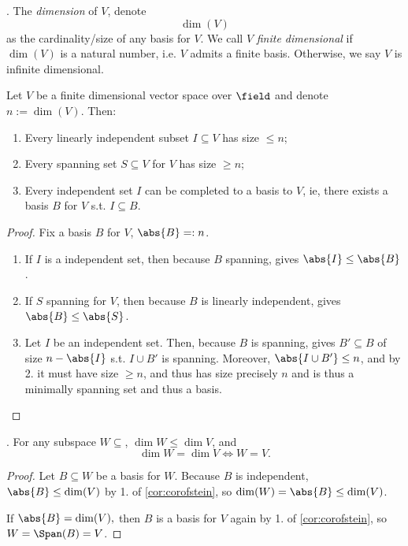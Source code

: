 \begin{definition}[Dimension]
     . The \emph{dimension} of $V$, denote $$\dim (V)$$ as the cardinality/size of any basis for $V$. We call $V$ \emph{finite dimensional} if $\dim (V)$ is a natural number, i.e. $V$ admits a finite basis. Otherwise, we say $V$ is infinite dimensional.
\end{definition}

\begin{corollary}\label{cor:corofstein}
    Let $V$ be a finite dimensional vector space over $\field$ and denote $n := \dim (V)$. Then: 
    \begin{enumerate}
        \item Every linearly independent subset $I \subseteq V$ has size $\leq n$;
        \item Every spanning set $S \subseteq V$ for $V$ has size $\geq n$;
        \item Every independent set $I$ can be completed to a basis to $V$, ie, there exists a basis $B$ for $V$ s.t. $I \subseteq B$.
    \end{enumerate}
\end{corollary}

\begin{proof}
    Fix a basis $B$ for $V$, $\abs{B} =: n$.
    \begin{enumerate}
        \item If $I$ is a independent set, then because $B$ spanning,  gives $\abs{I} \leq \abs{B}$.
        \item If $S$ spanning for $V$, then because $B$ is linearly independent,  gives $\abs{B} \leq \abs{S}$.
        \item Let $I$ be an independent set. Then, because $B$ is spanning,  gives $B' \subseteq B$ of size $n - \abs{I}$ s.t. $I \cup B'$ is spanning. Moreover, $\abs{I \cup B'} \leq n$, and by 2. it must have size $\geq n$, and thus has size precisely $n$ and is thus a minimally spanning set and thus a basis.
    \end{enumerate}
\end{proof}

\begin{corollary}
     . For any subspace $W \subseteq $, $\dim W \leq \dim V$, and $$\dim W = \dim V \iff W = V.$$
\end{corollary}

\begin{proof}
    Let $B \subseteq W$ be a basis for $W$. Because $B$ is independent, $\abs{B} \leq \dim (V)$ by 1. of \cref{cor:corofstein}, so $\dim (W) = \abs{B} \leq \dim (V)$.

    If $\abs{B} = \dim (V),$ then $B$ is a basis for $V$ again by 1. of \cref{cor:corofstein}, so $W = \Span (B) = V$.
\end{proof}